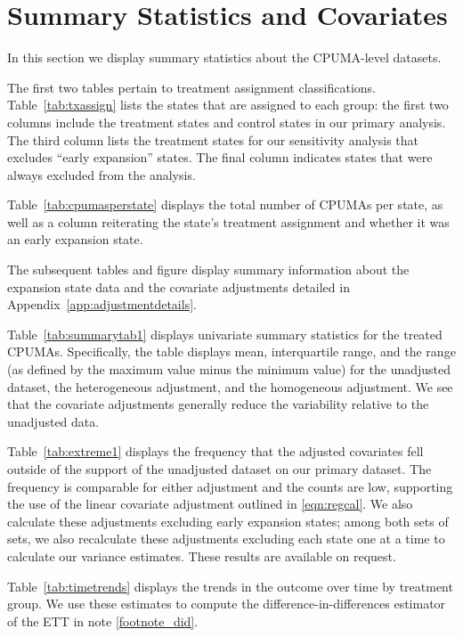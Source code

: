 \section{Summary Statistics and Covariates}\label{app:sumstats}

In this section we display summary statistics about the CPUMA-level datasets. 

The first two tables pertain to treatment assignment classifications. Table~\ref{tab:txassign} lists the states that are assigned to each group: the first two columns include the treatment states and control states in our primary analysis. The third column lists the treatment states for our sensitivity analysis that excludes ``early expansion'' states. The final column indicates states that were always excluded from the analysis. 

Table~\ref{tab:cpumasperstate} displays the total number of CPUMAs per state, as well as a column reiterating the state's treatment assignment and whether it was an early expansion state.

The subsequent tables and figure display summary information about the expansion state data and the covariate adjustments detailed in Appendix~\ref{app:adjustmentdetails}. 

Table~\ref{tab:summarytab1} displays univariate summary statistics for the treated CPUMAs. Specifically, the table displays mean, interquartile range, and the range (as defined by the maximum value minus the minimum value) for the unadjusted dataset, the heterogeneous adjustment, and the homogeneous adjustment. We see that the covariate adjustments generally reduce the variability relative to the unadjusted data. 

Table~\ref{tab:extreme1} displays the frequency that the adjusted covariates fell outside of the support of the unadjusted dataset on our primary dataset. The frequency is comparable for either adjustment and the counts are low, supporting the use of the linear covariate adjustment outlined in \eqref{eqn:regcal}. We also calculate these adjustments excluding early expansion states; among both sets of sets, we also recalculate these adjustments excluding each state one at a time to calculate our variance estimates. These results are available on request. 

Table~\ref{tab:timetrends} displays the trends in the outcome over time by treatment group. We use these estimates to compute the difference-in-differences estimator of the ETT in note \ref{footnote_did}. 

